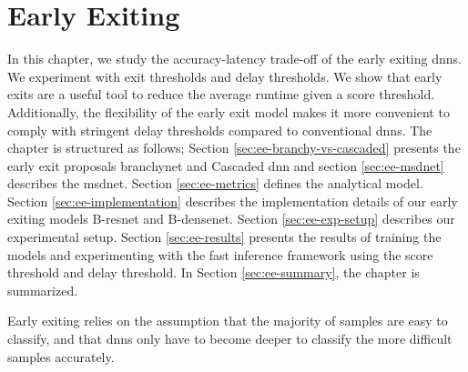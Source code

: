 \hypertarget{earlyexiting}{%
	\chapter{Early Exiting}\label{ch:earlyexit}}

In this chapter, we study the accuracy-latency trade-off of the early exiting \gls{dnn}s. We experiment with exit thresholds and delay thresholds. We show that early exits are a useful tool to reduce the average runtime given a score threshold. Additionally, the flexibility of the early exit model makes it more convenient to comply with stringent delay thresholds compared to conventional \gls{dnn}s. The chapter is structured as follows; Section \ref{sec:ee-branchy-vs-cascaded} presents the early exit proposals \gls{branchynet} and Cascaded \gls{dnn} and section \ref{sec:ee-msdnet} describes the \gls{msdnet}. Section \ref{sec:ee-metrics} defines the analytical model. Section \ref{sec:ee-implementation} describes the implementation details of our early exiting models B-\gls{resnet} and B-\gls{densenet}. Section \ref{sec:ee-exp-setup} describes our experimental setup. Section \ref{sec:ee-results} presents the results of training the models and experimenting with the fast inference framework using the score threshold and delay threshold. In Section \ref{sec:ee-summary}, the chapter is summarized.

Early exiting relies on the assumption that the majority of samples are easy to classify, and that \gls{dnn}s only have to become deeper to classify the more difficult samples accurately. 

